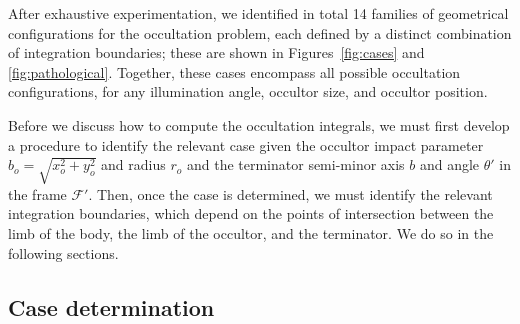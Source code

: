 \documentclass[modern]{aastex62}
\begin{document}
After exhaustive experimentation, we identified in total 14 families of
geometrical configurations for the occultation problem,
each defined by a distinct combination of integration
boundaries; these are shown in Figures~\ref{fig:cases} and
\ref{fig:pathological}.
Together, these cases encompass all possible
occultation configurations, for any illumination angle, occultor size, and
occultor position.

Before we discuss how to compute the occultation integrals, we must first
develop a procedure to identify the relevant case given the occultor
impact parameter $b_o = \sqrt{x_o^2 + y_o^2}$ and radius $r_o$ and
the terminator semi-minor
axis $b$ and angle $\theta'$ in the frame $\mathcal{F}'$.
Then, once the case is determined, we must
identify the relevant integration boundaries, which depend on the points
of intersection between the limb of the body, the limb of the occultor, and
the terminator. We do so in the following sections.

%

\subsection{Case determination}
\label{sec:which-case}
\end{document}
